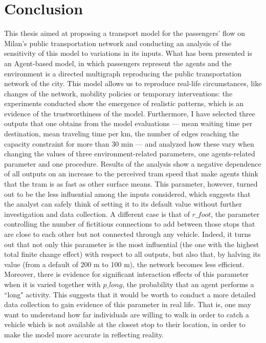 \chapter{Conclusion}

This thesis aimed at proposing a transport model for the passengers' flow on Milan's public transportation network and conducting an analysis of the sensitivity of this model to variations in its inputs. What has been presented is an Agent-based model, in which passengers represent the agents and the environment is a directed multigraph reproducing the public transportation network of the city. 
This model allows us to reproduce real-life circumstances, like changes of the network, mobility policies or temporary interventions: the experiments conducted show the emergence of realistic patterns, which is an evidence of the trustworthiness of the model.
Furthermore, I have selected three outputs that one obtains from the model evaluations --- mean waiting time per destination, mean traveling time per km, the number of edges reaching the capacity constraint for more than 30 min --- and analyzed how these vary when changing the values of three environment-related parameters, one agents-related parameter and one procedure. Results of the analysis show a negative dependence of all outputs on an increase to the perceived tram speed that make agents think that the tram is as fast as other surface means. This parameter, however, turned out to be the less influential among the inputs considered, which suggests that the analyst can safely think of setting it to its default value without further investigation and data collection. A different case is that of $r\_foot$, the parameter controlling the number of fictitious connections to add between those stops that are close to each other but not connected through any vehicle. Indeed, it turns out that not only this parameter is the most influential (the one with the highest total finite change effect) with respect to all outputs, but also that, by halving its value (from a default of 200 m to 100 m), the network becomes less efficient. Moreover, there is evidence for significant interaction effects of this parameter when it is varied together with $p\_long$, the probability that an agent performs a ``long" activity. This suggests that it would be worth to conduct a more detailed data collection to gain evidence of this parameter in real life. That is, one may want to understand how far individuals are willing to walk in order to catch a vehicle which is not available at the closest stop to their location, in order to make the model more accurate in reflecting reality. 
